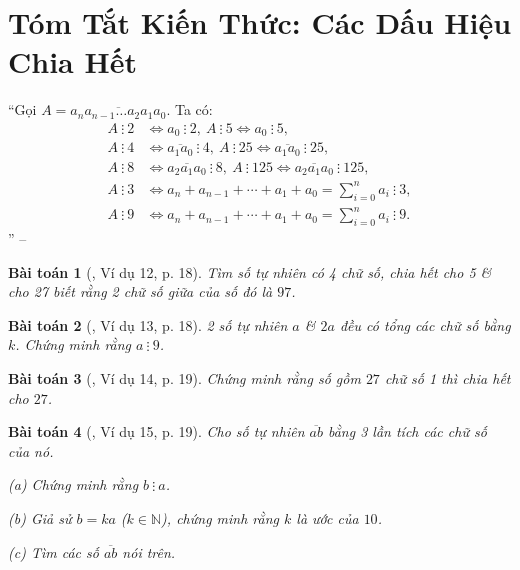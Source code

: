 \documentclass{article}
\numberwithin{equation}{section}
\newtheorem{baitoan}{Bài toán}[section]
\begin{document}
\section*{Tóm Tắt Kiến Thức: Các Dấu Hiệu Chia Hết}
``Gọi $A = \overline{a_na_{n-1}\ldots a_2a_1a_0}$. Ta có:
\begin{align*}
	A\ \vdots\ 2&\Leftrightarrow a_0\ \vdots\ 2,\ A\ \vdots\ 5\Leftrightarrow a_0\ \vdots\ 5,\\
	A\ \vdots\ 4&\Leftrightarrow\overline{a_1a_0}\ \vdots\ 4,\ A\ \vdots\ 25\Leftrightarrow\overline{a_1a_0}\ \vdots\ 25,\\
	A\ \vdots\ 8&\Leftrightarrow\overline{a_2a_1a_0}\ \vdots\ 8,\ A\ \vdots\ 125\Leftrightarrow\overline{a_2a_1a_0}\ \vdots\ 125,\\
	A\ \vdots\ 3&\Leftrightarrow a_n + a_{n-1} + \cdots + a_1 + a_0 = \sum_{i=0}^n a_i\ \vdots\ 3,\\
	A\ \vdots\ 9&\Leftrightarrow a_n + a_{n-1} + \cdots + a_1 + a_0 = \sum_{i=0}^n a_i\ \vdots\ 9.
\end{align*}
'' -- \cite[\S4, p. 18]{Binh_Toan_6_tap_1}

\begin{baitoan}[\cite{Binh_Toan_6_tap_1}, Ví dụ 12, p. 18]
	Tìm số tự nhiên có 4 chữ số, chia hết cho 5 \& cho 27 biết rằng 2 chữ số giữa của số đó là $97$.
\end{baitoan}

\begin{baitoan}[\cite{Binh_Toan_6_tap_1}, Ví dụ 13, p. 18]
	2 số tự nhiên $a$ \& $2a$ đều có tổng các chữ số bằng $k$. Chứng minh rằng $a\ \vdots\ 9$.
\end{baitoan}

\begin{baitoan}[\cite{Binh_Toan_6_tap_1}, Ví dụ 14, p. 19]
	Chứng minh rằng số gồm $27$ chữ số 1 thì chia hết cho $27$.
\end{baitoan}

\begin{baitoan}[\cite{Binh_Toan_6_tap_1}, Ví dụ 15, p. 19]
	Cho số tự nhiên $\overline{ab}$ bằng 3 lần tích các chữ số của nó.
	\begin{enumerate*}
		\item[(a)] Chứng minh rằng $b\ \vdots\ a$.
		\item[(b)] Giả sử $b = ka$ ($k\in\mathbb{N}$), chứng minh rằng $k$ là ước của $10$.
		\item[(c)] Tìm các số $\overline{ab}$ nói trên.
	\end{enumerate*}
\end{baitoan}
\end{document}
